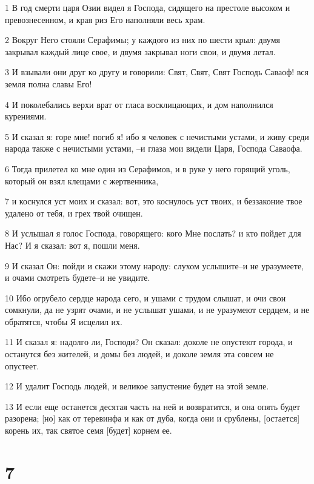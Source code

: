 \par 1 В год смерти царя Озии видел я Господа, сидящего на престоле высоком и превознесенном, и края риз Его наполняли весь храм.
\par 2 Вокруг Него стояли Серафимы; у каждого из них по шести крыл: двумя закрывал каждый лице свое, и двумя закрывал ноги свои, и двумя летал.
\par 3 И взывали они друг ко другу и говорили: Свят, Свят, Свят Господь Саваоф! вся земля полна славы Его!
\par 4 И поколебались верхи врат от гласа восклицающих, и дом наполнился курениями.
\par 5 И сказал я: горе мне! погиб я! ибо я человек с нечистыми устами, и живу среди народа также с нечистыми устами, --и глаза мои видели Царя, Господа Саваофа.
\par 6 Тогда прилетел ко мне один из Серафимов, и в руке у него горящий уголь, который он взял клещами с жертвенника,
\par 7 и коснулся уст моих и сказал: вот, это коснулось уст твоих, и беззаконие твое удалено от тебя, и грех твой очищен.
\par 8 И услышал я голос Господа, говорящего: кого Мне послать? и кто пойдет для Нас? И я сказал: вот я, пошли меня.
\par 9 И сказал Он: пойди и скажи этому народу: слухом услышите--и не уразумеете, и очами смотреть будете--и не увидите.
\par 10 Ибо огрубело сердце народа сего, и ушами с трудом слышат, и очи свои сомкнули, да не узрят очами, и не услышат ушами, и не уразумеют сердцем, и не обратятся, чтобы Я исцелил их.
\par 11 И сказал я: надолго ли, Господи? Он сказал: доколе не опустеют города, и останутся без жителей, и домы без людей, и доколе земля эта совсем не опустеет.
\par 12 И удалит Господь людей, и великое запустение будет на этой земле.
\par 13 И если еще останется десятая часть на ней и возвратится, и она опять будет разорена; [но] как от теревинфа и как от дуба, когда они и срублены, [остается] корень их, так святое семя [будет] корнем ее.

\chapter{7}


